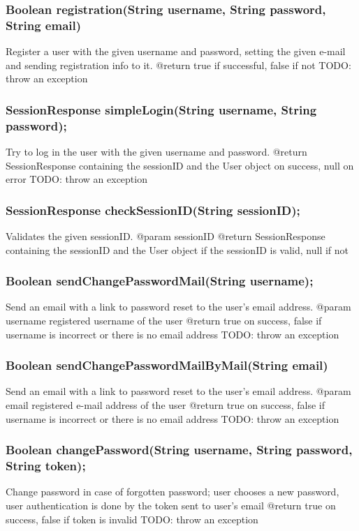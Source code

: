 \subsubsection{Boolean registration(String username, String password, String email)}
Register a user with the given username and password, setting the given e-mail and sending registration info to it.
@return true if successful, false if not
TODO: throw an exception


\subsubsection{SessionResponse simpleLogin(String username, String password);}
Try to log in the user with the given username and password.
@return SessionResponse containing the sessionID and the User object on success, null on error
TODO: throw an exception


\subsubsection{SessionResponse checkSessionID(String sessionID);}
Validates the given sessionID.
@param sessionID
@return SessionResponse containing the sessionID and the User object if the sessionID is valid, null if not


\subsubsection{Boolean sendChangePasswordMail(String username);}
Send an email with a link to password reset
to the user's email address.
@param username registered username of the user
@return true on success, false if username is incorrect or there is no email address
TODO: throw an exception


\subsubsection{Boolean sendChangePasswordMailByMail(String email)}
Send an email with a link to password reset
to the user's email address.
@param email registered e-mail address of the user
@return true on success, false if username is incorrect or there is no email address
TODO: throw an exception

    

\subsubsection{Boolean changePassword(String username, String password, String token);}
Change password in case of forgotten password;
user chooses a new password,
user authentication is done by the token sent to user's email
@return true on success, false if token is invalid
TODO: throw an exception

